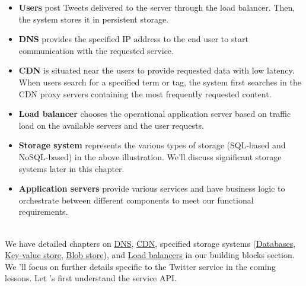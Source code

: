 \begin{itemize}
\item
\protect{}\label{HcvVxQ2NWS-Do-RkjiLLr}
\textbf{Users} post Tweets delivered to the server through the load balancer. Then, the system stores it in persistent storage.
\item
\protect{}\label{4uY-JMxnfCA9JQQXk2Tpi}
\textbf{DNS} provides the specified IP address to the end user to start communication with the requested service.
\item
\protect{}\label{-OzVIfspS-WOBOs_pWbiZ}
\textbf{CDN} is situated near the users to provide requested data with low latency. When users search for a specified term or tag, the system first searches in the CDN proxy servers containing the most frequently requested content.
\item
\protect{}\label{xkLClnpk43h5T9XCmUCyL}
\textbf{Load balancer} chooses the operational application server based on traffic load on the available servers and the user requests.
\item
\protect{}\label{8fsOmkTh7GW_aaTNfI_tA}
\textbf{Storage system} represents the various types of storage (SQL-based and NoSQL-based) in the above illustration. We'll discuss significant storage systems later in this chapter.
\item
\protect{}\label{CLcbhAk19_jrh3K7znTix}
\textbf{Application servers} provide various services and have business logic to orchestrate between different components to meet our functional requirements.
\end{itemize}
\\
We have detailed chapters on \href{https://www.educative.io/courses/grokking-the-system-design-interview/introduction-to-domain-name-system-dns}{DNS}, \href{https://www.educative.io/courses/grokking-the-system-design-interview/system-design-the-content-delivery-network-cdn}{CDN}, specified storage systems (\href{https://www.educative.io/courses/grokking-the-system-design-interview/introduction-to-databases}{Databases}, \href{https://www.educative.io/courses/grokking-the-system-design-interview/system-design-the-key-value-store}{Key-value store}, \href{https://www.educative.io/courses/grokking-the-system-design-interview/system-design-a-blob-store}{Blob store}), and \href{https://www.educative.io/courses/grokking-the-system-design-interview/introduction-to-load-balancers}{Load balancers} in our building blocks section. We 'll focus on further details specific to the Twitter service in the coming lessons. Let
's first understand the service API.

